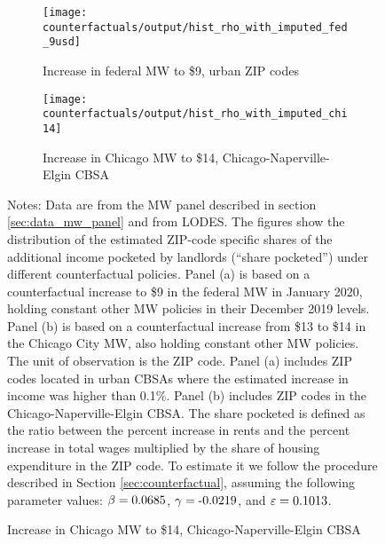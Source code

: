 \begin{figure}[h!]
    \centering
    \caption{Estimated shares pocketed by landlords under counterfactual MW policies}
    \label{fig:cf_hist_shares}

    \begin{subfigure}{0.65\textwidth}
        \caption{Increase in federal MW to \$9, urban ZIP codes}
        \texttt{[image: counterfactuals/output/hist\_rho\_with\_imputed\_fed\_9usd]}
    \end{subfigure}

    \begin{subfigure}{0.65\textwidth}
        \caption{Increase in Chicago MW to \$14, Chicago-Naperville-Elgin CBSA}
        \texttt{[image: counterfactuals/output/hist\_rho\_with\_imputed\_chi14]}
    \end{subfigure}

    \begin{minipage}{.95\textwidth} \footnotesize
        \vspace{3mm}
        Notes:
        Data are from the MW panel described in section \ref{sec:data_mw_panel} 
        and from LODES.
        The figures show the distribution of the estimated ZIP-code specific
        shares of the additional income pocketed by landlords (``share pocketed'')
        under different counterfactual policies.
        Panel (a) is based on a counterfactual increase to \$9 in the 
        federal MW in January 2020, holding constant other MW policies in their 
        December 2019 levels.
        Panel (b) is based on a counterfactual increase from \$13 to \$14 in the 
        Chicago City MW, also holding constant other MW policies.
        The unit of observation is the ZIP code.
        Panel (a) includes ZIP codes located in urban CBSAs where the estimated 
        increase in income was higher than 0.1\%.
        Panel (b) includes ZIP codes in the Chicago-Naperville-Elgin CBSA.
        The share pocketed is defined as the ratio between the percent increase 
        in rents and the percent increase in total wages multiplied by the share 
        of housing expenditure in the ZIP code.
        To estimate it we follow the procedure described in Section 
        \ref{sec:counterfactual}, assuming the following parameter values: 
        $\beta = \textnormal{0.0685}$, $\gamma = \textnormal{-0.0219}$, and $\varepsilon = \textnormal{0.1013}$.
    \end{minipage}
\end{figure}
